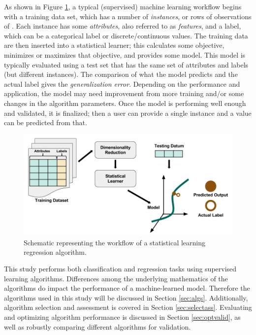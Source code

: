 As shown in Figure \ref{fig:supervised}, a typical (supervised) machine
learning workflow begins with a training data set, which has a number of
\textit{instances}, or rows of observations of .  Each instance has some
\textit{attributes}, also referred to as \textit{features}, and a label, which
can be a categorical label or discrete/continuous values.  The training data
are then inserted into a statistical learner; this calculates some objective,
minimizes or maximizes that objective, and provides some model. This model is
typically evaluated using a test set that has the same set of attributes and
labels (but different instances). The comparison of what the model predicts and
the actual label gives the \textit{generalization error}. Depending on the
performance and application, the model may need improvement from more training
and/or some changes in the algorithm parameters. Once the model is performing
well enough and validated, it is finalized; then a user can provide a single
instance and a value can be predicted from that. 

\begin{figure}[!htb]
  \includegraphics[width=\linewidth]{./chapters/intro/SupervisedRegression.png}
  \caption{Schematic representing the workflow of a statistical learning regression algorithm.}
  \label{fig:supervised}
\end{figure}

This study performs both classification and regression tasks using supervised
learning algorithms.  Differences among the underlying mathematics  of the algorithms do impact the performance of a machine-learned model.
Therefore the algorithms used in this study will be discussed in Section
\ref{sec:algs}. Additionally, algorithm selection and assessment is covered in
Section \ref{sec:selectass}.  Evaluating and optimizing algorithm performance
is discussed in Section \ref{sec:optvalid}, as well as robustly comparing
different algorithms for validation.

